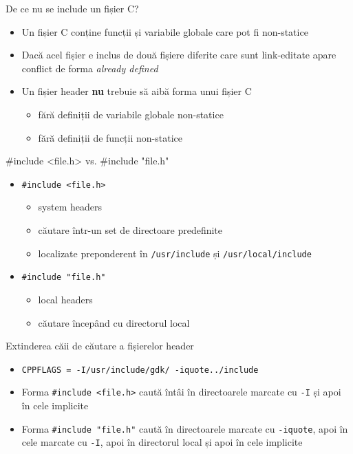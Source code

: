 \documentclass{beamer}
\begin{document}
\begin{frame}{De ce nu se include un fișier C?}
	\begin{itemize}
		\item Un fișier C conține funcții și variabile globale care pot fi non-statice
		\item Dacă acel fișier e inclus de două fișiere diferite care sunt
link-editate apare conflict de forma \textit{already defined}
		\item Un fișier header \textbf{nu} trebuie să aibă forma unui fișier C
			\begin{itemize}
				\item fără definiții de variabile globale non-statice
				\item fără definiții de funcții non-statice
			\end{itemize}
	\end{itemize}
\end{frame}

\begin{frame}{\#include \textless{}file.h\textgreater{} vs. \#include "file.h"}
	\begin{itemize}
		\item \texttt{\#include \textless{}file.h\textgreater{}}
			\begin{itemize}
				\item system headers
				\item căutare într-un set de directoare predefinite
				\item localizate preponderent în \texttt{/usr/include} și
\texttt{/usr/local/include}
			\end{itemize}
		\item \texttt{\#include "file.h"}
			\begin{itemize}
				\item local headers
				\item căutare începând cu directorul local
			\end{itemize}
	\end{itemize}
\end{frame}

\begin{frame}{Extinderea căii de căutare a fișierelor header}
	\begin{itemize}
		\item \texttt{CPPFLAGS = -I/usr/include/gdk/ -iquote../include}
		\item Forma \texttt{\#include \textless{}file.h\textgreater{}} caută
întâi în directoarele marcate cu \texttt{-I} și apoi în cele implicite
		\item Forma \texttt{\#include "file.h"} caută în directoarele marcate
cu \texttt{-iquote}, apoi în cele marcate cu \texttt{-I}, apoi în directorul
local și apoi în cele implicite
	\end{itemize}
\end{frame}
\end{document}
